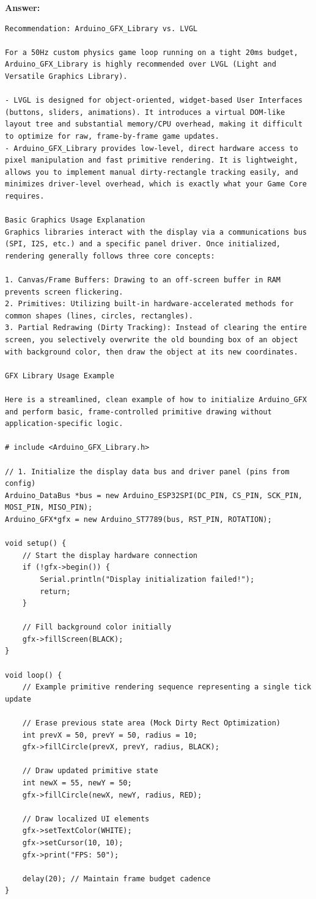 \textbf{Answer:}
\begin{lstlisting}[language={}, breaklines=true]
Recommendation: Arduino_GFX_Library vs. LVGL

For a 50Hz custom physics game loop running on a tight 20ms budget, Arduino_GFX_Library is highly recommended over LVGL (Light and Versatile Graphics Library).

- LVGL is designed for object-oriented, widget-based User Interfaces (buttons, sliders, animations). It introduces a virtual DOM-like layout tree and substantial memory/CPU overhead, making it difficult to optimize for raw, frame-by-frame game updates.
- Arduino_GFX_Library provides low-level, direct hardware access to pixel manipulation and fast primitive rendering. It is lightweight, allows you to implement manual dirty-rectangle tracking easily, and minimizes driver-level overhead, which is exactly what your Game Core requires.

Basic Graphics Usage Explanation
Graphics libraries interact with the display via a communications bus (SPI, I2S, etc.) and a specific panel driver. Once initialized, rendering generally follows three core concepts:

1. Canvas/Frame Buffers: Drawing to an off-screen buffer in RAM prevents screen flickering.
2. Primitives: Utilizing built-in hardware-accelerated methods for common shapes (lines, circles, rectangles).
3. Partial Redrawing (Dirty Tracking): Instead of clearing the entire screen, you selectively overwrite the old bounding box of an object with background color, then draw the object at its new coordinates.

GFX Library Usage Example

Here is a streamlined, clean example of how to initialize Arduino_GFX and perform basic, frame-controlled primitive drawing without application-specific logic.

# include <Arduino_GFX_Library.h>

// 1. Initialize the display data bus and driver panel (pins from config)
Arduino_DataBus *bus = new Arduino_ESP32SPI(DC_PIN, CS_PIN, SCK_PIN, MOSI_PIN, MISO_PIN);
Arduino_GFX*gfx = new Arduino_ST7789(bus, RST_PIN, ROTATION);

void setup() {
    // Start the display hardware connection
    if (!gfx->begin()) {
        Serial.println("Display initialization failed!");
        return;
    }

    // Fill background color initially
    gfx->fillScreen(BLACK);
}

void loop() {
    // Example primitive rendering sequence representing a single tick update

    // Erase previous state area (Mock Dirty Rect Optimization)
    int prevX = 50, prevY = 50, radius = 10;
    gfx->fillCircle(prevX, prevY, radius, BLACK); 
    
    // Draw updated primitive state
    int newX = 55, newY = 50;
    gfx->fillCircle(newX, newY, radius, RED);
    
    // Draw localized UI elements 
    gfx->setTextColor(WHITE);
    gfx->setCursor(10, 10);
    gfx->print("FPS: 50");

    delay(20); // Maintain frame budget cadence
}
\end{lstlisting}
